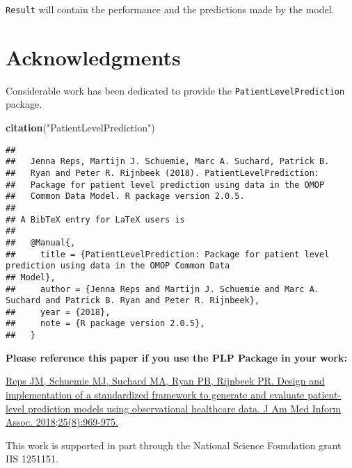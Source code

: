 \documentclass[]{article}
\newenvironment{Shaded}{\begin{snugshade}}{\end{snugshade}}
\newcommand{\KeywordTok}[1]{\textcolor[rgb]{0.13,0.29,0.53}{\textbf{#1}}}
\newcommand{\StringTok}[1]{\textcolor[rgb]{0.31,0.60,0.02}{#1}}
\newcommand{\NormalTok}[1]{#1}
\begin{document}
\texttt{Result} will contain the performance and the predictions made by
the model.

\section{Acknowledgments}\label{acknowledgments}

Considerable work has been dedicated to provide the
\texttt{PatientLevelPrediction} package.

\begin{Shaded}
\begin{Highlighting}[]
\KeywordTok{citation}\NormalTok{(}\StringTok{"PatientLevelPrediction"}\NormalTok{)}
\end{Highlighting}
\end{Shaded}

\begin{verbatim}
## 
##   Jenna Reps, Martijn J. Schuemie, Marc A. Suchard, Patrick B.
##   Ryan and Peter R. Rijnbeek (2018). PatientLevelPrediction:
##   Package for patient level prediction using data in the OMOP
##   Common Data Model. R package version 2.0.5.
## 
## A BibTeX entry for LaTeX users is
## 
##   @Manual{,
##     title = {PatientLevelPrediction: Package for patient level prediction using data in the OMOP Common Data
## Model},
##     author = {Jenna Reps and Martijn J. Schuemie and Marc A. Suchard and Patrick B. Ryan and Peter R. Rijnbeek},
##     year = {2018},
##     note = {R package version 2.0.5},
##   }
\end{verbatim}

\textbf{Please reference this paper if you use the PLP Package in your
work:}

\href{http://dx.doi.org/10.1093/jamia/ocy032}{Reps JM, Schuemie MJ,
Suchard MA, Ryan PB, Rijnbeek PR. Design and implementation of a
standardized framework to generate and evaluate patient-level prediction
models using observational healthcare data. J Am Med Inform Assoc.
2018;25(8):969-975.}

This work is supported in part through the National Science Foundation
grant IIS 1251151.
\end{document}
